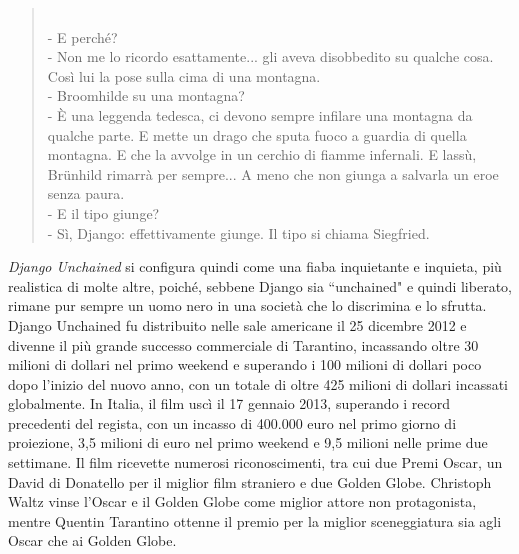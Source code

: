 \documentclass[12pt]{article} %
\begin{document}
\begin{flushleft}
\begin{quote}
{        \\- E perché?
        \\- Non me lo ricordo esattamente... gli aveva disobbedito su qualche cosa. Così lui la pose sulla cima di una montagna.
        \\- Broomhilde su una montagna?
        \\- È una leggenda tedesca, ci devono sempre infilare una montagna da qualche parte. E mette un drago che sputa fuoco a guardia di quella montagna. E che la avvolge in un cerchio di fiamme infernali. E lassù, Brünhild rimarrà per sempre... A meno che non giunga a salvarla un eroe senza paura.
        \\- E il tipo giunge?
        \\- Sì, Django: effettivamente giunge. Il tipo si chiama Siegfried.}
    \end{quote}
    \textit{Django Unchained} si configura quindi come una fiaba inquietante e inquieta, più realistica di molte altre, poiché, sebbene Django sia ``unchained" e quindi liberato, rimane pur sempre un uomo nero in una società che lo discrimina e lo sfrutta. 
    \\\vspace{1cm}
    Django Unchained fu distribuito nelle sale americane il 25 dicembre 2012 e divenne il più grande successo commerciale di Tarantino, incassando oltre 30 milioni di dollari nel primo weekend e superando i 100 milioni di dollari poco dopo l'inizio del nuovo anno, con un totale di oltre 425 milioni di dollari incassati globalmente. In Italia, il film uscì il 17 gennaio 2013, superando i record precedenti del regista, con un incasso di 400.000 euro nel primo giorno di proiezione, 3,5 milioni di euro nel primo weekend e 9,5 milioni nelle prime due settimane. 
    Il film ricevette numerosi riconoscimenti, tra cui due Premi Oscar, un David di Donatello per il miglior film straniero e due Golden Globe. Christoph Waltz vinse l'Oscar e il Golden Globe come miglior attore non protagonista, mentre Quentin Tarantino ottenne il premio per la miglior sceneggiatura sia agli Oscar che ai Golden Globe.
\end{flushleft}
\break
\end{document}
